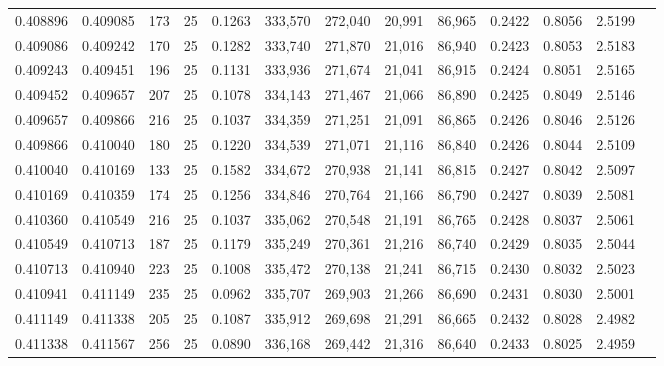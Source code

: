 \begin{tabular}{rrrrrrrrrrrrr}
0.408896 & 0.409085 &   173 &  25 &                                     0.1263 & 333,570 & 272,040 &  20,991 &  86,965 & 0.2422 & 0.8056 & 2.5199 \\
0.409086 & 0.409242 &   170 &  25 &                                     0.1282 & 333,740 & 271,870 &  21,016 &  86,940 & 0.2423 & 0.8053 & 2.5183 \\
0.409243 & 0.409451 &   196 &  25 &                                     0.1131 & 333,936 & 271,674 &  21,041 &  86,915 & 0.2424 & 0.8051 & 2.5165 \\
0.409452 & 0.409657 &   207 &  25 &                                     0.1078 & 334,143 & 271,467 &  21,066 &  86,890 & 0.2425 & 0.8049 & 2.5146 \\
0.409657 & 0.409866 &   216 &  25 &                                     0.1037 & 334,359 & 271,251 &  21,091 &  86,865 & 0.2426 & 0.8046 & 2.5126 \\
0.409866 & 0.410040 &   180 &  25 &                                     0.1220 & 334,539 & 271,071 &  21,116 &  86,840 & 0.2426 & 0.8044 & 2.5109 \\
0.410040 & 0.410169 &   133 &  25 &                                     0.1582 & 334,672 & 270,938 &  21,141 &  86,815 & 0.2427 & 0.8042 & 2.5097 \\
0.410169 & 0.410359 &   174 &  25 &                                     0.1256 & 334,846 & 270,764 &  21,166 &  86,790 & 0.2427 & 0.8039 & 2.5081 \\
0.410360 & 0.410549 &   216 &  25 &                                     0.1037 & 335,062 & 270,548 &  21,191 &  86,765 & 0.2428 & 0.8037 & 2.5061 \\
0.410549 & 0.410713 &   187 &  25 &                                     0.1179 & 335,249 & 270,361 &  21,216 &  86,740 & 0.2429 & 0.8035 & 2.5044 \\
0.410713 & 0.410940 &   223 &  25 &                                     0.1008 & 335,472 & 270,138 &  21,241 &  86,715 & 0.2430 & 0.8032 & 2.5023 \\
0.410941 & 0.411149 &   235 &  25 &                                     0.0962 & 335,707 & 269,903 &  21,266 &  86,690 & 0.2431 & 0.8030 & 2.5001 \\
0.411149 & 0.411338 &   205 &  25 &                                     0.1087 & 335,912 & 269,698 &  21,291 &  86,665 & 0.2432 & 0.8028 & 2.4982 \\
0.411338 & 0.411567 &   256 &  25 &                                     0.0890 & 336,168 & 269,442 &  21,316 &  86,640 & 0.2433 & 0.8025 & 2.4959 \\

\end{tabular}
